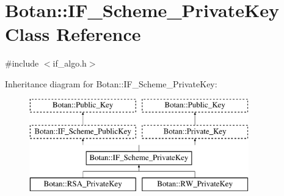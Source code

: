 \hypertarget{classBotan_1_1IF__Scheme__PrivateKey}{\section{Botan\-:\-:I\-F\-\_\-\-Scheme\-\_\-\-Private\-Key Class Reference}
\label{classBotan_1_1IF__Scheme__PrivateKey}
}


{\ttfamily \#include $<$if\-\_\-algo.\-h$>$}

Inheritance diagram for Botan\-:\-:I\-F\-\_\-\-Scheme\-\_\-\-Private\-Key\-:\begin{figure}[H]
\begin{center}
\leavevmode
\includegraphics[height=4.000000cm]{classBotan_1_1IF__Scheme__PrivateKey}
\end{center}
\end{figure}
